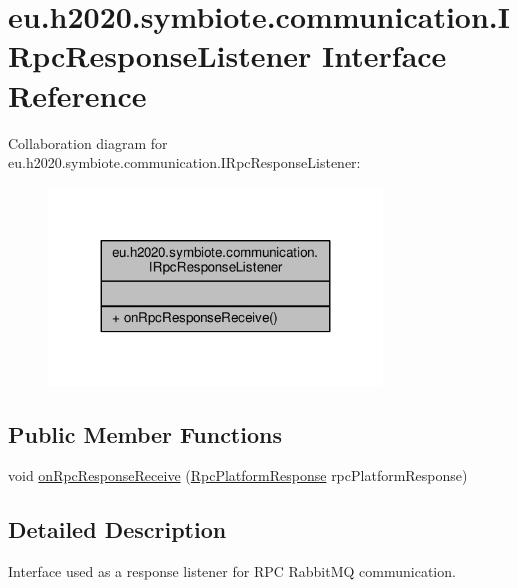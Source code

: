 \hypertarget{interfaceeu_1_1h2020_1_1symbiote_1_1communication_1_1IRpcResponseListener}{}\section{eu.\+h2020.\+symbiote.\+communication.\+I\+Rpc\+Response\+Listener Interface Reference}
\label{interfaceeu_1_1h2020_1_1symbiote_1_1communication_1_1IRpcResponseListener}


Collaboration diagram for eu.\+h2020.\+symbiote.\+communication.\+I\+Rpc\+Response\+Listener\+:
\nopagebreak
\begin{figure}[H]
\begin{center}
\leavevmode
\includegraphics[width=251pt]{interfaceeu_1_1h2020_1_1symbiote_1_1communication_1_1IRpcResponseListener__coll__graph}
\end{center}
\end{figure}
\subsection*{Public Member Functions}
\begin{DoxyCompactItemize}
\item 
void \hyperlink{interfaceeu_1_1h2020_1_1symbiote_1_1communication_1_1IRpcResponseListener_ad9d4acebc86817e20f4ce3e07aeee8ae}{on\+Rpc\+Response\+Receive} (\hyperlink{classeu_1_1h2020_1_1symbiote_1_1model_1_1RpcPlatformResponse}{Rpc\+Platform\+Response} rpc\+Platform\+Response)
\end{DoxyCompactItemize}


\subsection{Detailed Description}
Interface used as a response listener for R\+PC Rabbit\+MQ communication. 

